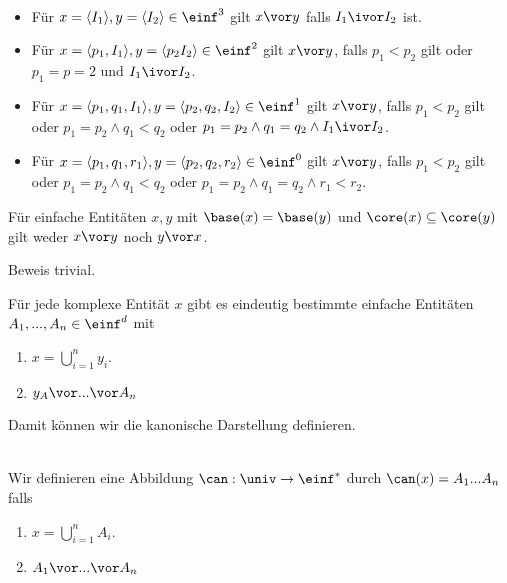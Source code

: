\begin{dfn}\ 
    \begin{itemize}
        \item Für $x = \langle I_1 \rangle, y = \langle I_2 \rangle \in \einf^3$ gilt $x \vor y$ falls $I_1 \ivor I_2$ ist.
        \item Für $x = \langle p_1, I_1 \rangle, y = \langle p_2 I_2 \rangle \in \einf^2$ gilt $x \vor y$, falls $p_1 < p_2$ gilt oder $p_1 = p=2$ und $I_1 \ivor I_2$.
        \item Für $x = \langle p_1, q_1, I_1 \rangle, y = \langle p_2, q_2, I_2 \rangle \in \einf^1$ gilt $x \vor y$, falls $p_1 < p_2$ gilt oder $p_1 = p_2 \land  q_1 < q_2$ oder $p_1 = p_2 \land q_1 = q_2 \land I_1 \ivor I_2$.
        \item Für $x = \langle p_1, q_1, r_1 \rangle, y = \langle p_2, q_2, r_2 \rangle \in \einf^0$ gilt $x \vor y$, falls $p_1 < p_2$ gilt oder $p_1 = p_2 \land  q_1 < q_2$ oder $p_1 = p_2 \land q_1 = q_2 \land r_1 < r_2$.
    \end{itemize}
\end{dfn}


\begin{satz}\label{satz:teil-nicht-vor}
    Für einfache Entitäten $x,y$ mit $\base(x) = \base(y)$ und $\core(x) \subseteq
    \core(y)$ gilt weder $x \vor y$ noch $y \vor x$.
\end{satz}
Beweis trivial.


Für jede komplexe Entität $x$ gibt es eindeutig bestimmte einfache Entitäten $A_1, ..., A_n \in \einf^d$ mit
\begin{enumerate}
    \item $x = \bigcup_{i=1}^n y_i$.
    \item $y_A \vor ... \vor A_n$
\end{enumerate}
Damit können wir die kanonische Darstellung definieren.


\begin{dfn}\ \\
    Wir definieren eine Abbildung $\can: \univ \to \einf^*$ durch $\can(x) = A_1 ... A_n$ falls
    \begin{enumerate}
        \item $x = \bigcup_{i=1}^n A_i$.
        \item $A_1 \vor ... \vor A_n$
    \end{enumerate}
\end{dfn}

